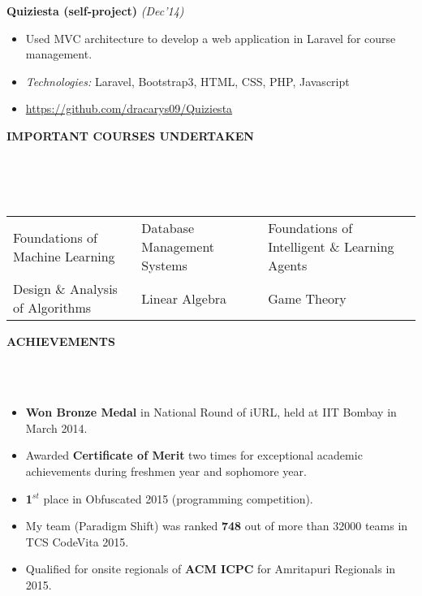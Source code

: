 \documentclass[a4paper,10pt]{article}
\newcommand{\lsep}{-0.5cm}
\newcommand{\resheading}[1]{{\small \colorbox{mygrey}{\begin{minipage}{0.975\textwidth}{\textbf{#1 \vphantom{p\^{E}}}}\end{minipage} \hspace{0.2cm}}}}
\begin{document}
\indent\small{\textbf{Quiziesta (self-project)}}	\hfill	\small{\textit{(Dec'14)}}
\begin{itemize}
 \item Used MVC architecture to develop a web application in Laravel for course management.
 \item \textit{Technologies: } Laravel, Bootstrap3, HTML, CSS, PHP, Javascript
 \item \href{https://github.com/dracarys09/Quiziesta}{https://github.com/dracarys09/Quiziesta}
\end{itemize}

\resheading{\textbf{IMPORTANT COURSES UNDERTAKEN}}\\[\lsep]
\\ \\
\indent \begin{tabular*}{\textwidth}{@{\extracolsep{\fill}}lll}
Foundations of Machine Learning		&	Database Management Systems	&	Foundations of Intelligent \& Learning Agents \\
Design \& Analysis of Algorithms	&	Linear Algebra			&	Game Theory
\end{tabular*}

\resheading{\textbf{ACHIEVEMENTS}}\\[\lsep]
\\
\begin{itemize}
 \item \textbf{Won Bronze Medal} in National Round of iURL, held at IIT Bombay in March 2014.
 \item Awarded \textbf{Certificate of Merit} two times for exceptional academic achievements during freshmen year and sophomore year.
 \item \textbf{1}$^{st}$ place in Obfuscated 2015 (programming competition).
 \item My team (Paradigm Shift) was ranked \textbf{748} out of more than 32000 teams in TCS CodeVita 2015.
 \item Qualified for onsite regionals of \textbf{ACM ICPC} for Amritapuri Regionals in 2015.
\end{itemize}
\end{document}
